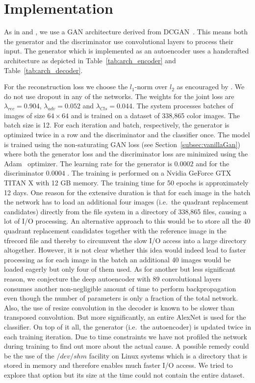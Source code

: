 \documentclass[a4paper,12pt]{report}
\begin{document}
\section{Implementation}\label{subsec:implementation}
As in \cite{DisentFacOfVarByMixTh} and \cite{InfoGAN}, we use a GAN architecture derived from DCGAN~\cite{DCGAN}. This means both the generator and the discriminator use convolutional layers to process their input. The generator which is implemented as an autoencoder uses a handcrafted architecture as depicted in Table~\ref{tab:arch_encoder} and Table~\ref{tab:arch_decoder}.


For the reconstruction loss we choose the $l_1$-norm over $l_2$ as encouraged by \cite{CondGAN_PatchGAN}. We do not use dropout in any of the networks. The weights for the joint loss are $ \lambda_{rec} = 0.904$, $\lambda_{adv} = 0.052$ and $ \lambda_{Cls} = 0.044$. The system processes batches of images of size $64 \times 64$ and is trained on a dataset of 338,865 color images. The batch size is 12. For each iteration and batch, respectively, the generator is optimized twice in a row and the discriminator and the classifier once. The model is trained using the non-saturating GAN loss (see Section~\ref{subsec:vanillaGan}) where both the generator loss and the discriminator loss are minimized using the Adam~\cite{AdamOptim} optimizer. The learning rate for the generator is $0.0002$ and for the discriminator $0.0004$ \cite{TTUR}. The training is performed on a Nvidia GeForce GTX TITAN X with 12 GB memory. The training time for 50 epochs is approximately 12 days. One reason for the extensive duration is that for each image in the batch the network has to load an additional four images (i.e.\ the quadrant replacement candidates) directly from the file system in a directory of 338,865 files, causing a lot of I/O processing. An alternative approach to this would be to store all the 40 quadrant replacement candidates together with the reference image in the tfrecord file and thereby to circumvent the slow I/O access into a large directory altogether. However, it is not clear whether this idea would indeed lead to faster processing as for each image in the batch an additional 40 images would be loaded eagerly but only four of them used. As for another but less significant reason, we conjecture the deep autoencoder with 89 convolutional layers consumes another non-negligible amount of time to perform backpropagation even though the number of parameters is only a fraction of the total network. Also, the use of resize convolution in the decoder is known to be slower than transposed convolution. But more significantly, an entire AlexNet is used for the classifier. On top of it all, the generator (i.e.\ the autoencoder) is updated twice in each training iteration. Due to time constraints we have not profiled the network during training to find out more about the actual cause. A possible remedy could be the use of the $/dev/shm$ facility on Linux systems which is a directory that is stored in memory and therefore enables much faster I/O access. We tried to explore that option but its size at the time could not contain the entire dataset.
\end{document}

